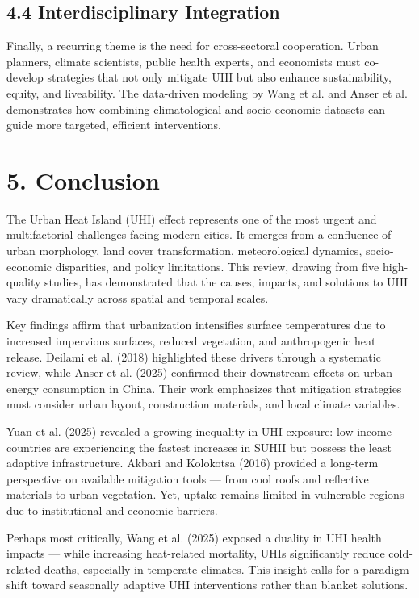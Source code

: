 \documentclass[draft]{agujournal}
\begin{document}
\subsection*{4.4 Interdisciplinary Integration}
Finally, a recurring theme is the need for cross-sectoral cooperation. Urban planners, climate scientists, public health experts, and economists must co-develop strategies that not only mitigate UHI but also enhance sustainability, equity, and liveability. The data-driven modeling by Wang et al. and Anser et al. demonstrates how combining climatological and socio-economic datasets can guide more targeted, efficient interventions.

\section*{5. Conclusion}

The Urban Heat Island (UHI) effect represents one of the most urgent and multifactorial challenges facing modern cities. It emerges from a confluence of urban morphology, land cover transformation, meteorological dynamics, socio-economic disparities, and policy limitations. This review, drawing from five high-quality studies, has demonstrated that the causes, impacts, and solutions to UHI vary dramatically across spatial and temporal scales.

Key findings affirm that urbanization intensifies surface temperatures due to increased impervious surfaces, reduced vegetation, and anthropogenic heat release. Deilami et al. (2018) highlighted these drivers through a systematic review, while Anser et al. (2025) confirmed their downstream effects on urban energy consumption in China. Their work emphasizes that mitigation strategies must consider urban layout, construction materials, and local climate variables.

Yuan et al. (2025) revealed a growing inequality in UHI exposure: low-income countries are experiencing the fastest increases in SUHII but possess the least adaptive infrastructure. Akbari and Kolokotsa (2016) provided a long-term perspective on available mitigation tools — from cool roofs and reflective materials to urban vegetation. Yet, uptake remains limited in vulnerable regions due to institutional and economic barriers.

Perhaps most critically, Wang et al. (2025) exposed a duality in UHI health impacts — while increasing heat-related mortality, UHIs significantly reduce cold-related deaths, especially in temperate climates. This insight calls for a paradigm shift toward seasonally adaptive UHI interventions rather than blanket solutions.
\end{document}
